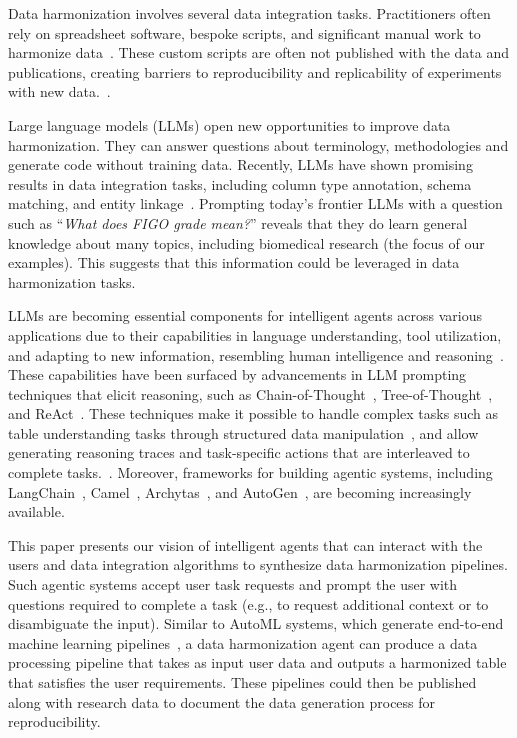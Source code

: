 Data harmonization involves several data integration tasks.
Practitioners often rely on spreadsheet software, bespoke scripts, and significant manual work to harmonize data~\cite{cheng2024general}. These custom scripts are often not published with the data and publications, creating barriers to reproducibility and replicability of experiments with new data.~\cite{healthcareInteroperability2025}.

Large language models (LLMs) open new opportunities to improve data harmonization. They can answer questions about terminology, methodologies and generate code without training data.
Recently, LLMs have shown promising results in data integration tasks, including column type annotation, schema matching, and entity linkage~\cite{narayan-vldb2022, chorus-vldb2024, feuer:vldb2024, tu2023unicorn}. Prompting today's frontier LLMs with a question such as ``\textit{What does FIGO grade mean?}'' reveals that they do learn general knowledge about many topics, including biomedical research (the focus of our examples). This suggests that this information could be leveraged in data harmonization tasks.

LLMs are becoming essential components for intelligent agents across various applications due to their capabilities in language understanding, tool utilization, and adapting to new information, resembling human intelligence and reasoning~\cite{yao2022react, xi2023-agents-survey, wang2024-agents-survey}. 
These capabilities have been surfaced by advancements in LLM prompting techniques that elicit reasoning, such as Chain-of-Thought~\cite{wei2022chain}, Tree-of-Thought~\cite{yao2024tree}, and ReAct~\cite{yao2022react}. These techniques make it possible to handle complex tasks such as table understanding tasks through structured data manipulation~\cite{wang2024chainoftable}, and allow generating reasoning traces and task-specific actions that are interleaved to complete tasks.~\cite{yao2022react}.
Moreover, frameworks for building agentic systems, including LangChain~\cite{langchain}, Camel~\cite{li2023camel}, Archytas~\cite{archytas}, and AutoGen~\cite{wu2023autogen}, are becoming increasingly available.

This paper presents our vision of
intelligent agents that can interact with the users and data integration algorithms to synthesize data harmonization pipelines.  
Such agentic systems accept user task requests and prompt the user with questions required to complete a task (e.g., to request additional context or to disambiguate the input).
Similar to AutoML systems, which generate end-to-end machine learning pipelines~\cite{lopez2023alphad3m, shang2019democratizing, berti2019learn2clean}, a data harmonization agent can produce a data processing pipeline that takes as input user data and outputs a harmonized table that satisfies the user requirements. These pipelines could then be published along with research data to document the data generation process for reproducibility.


